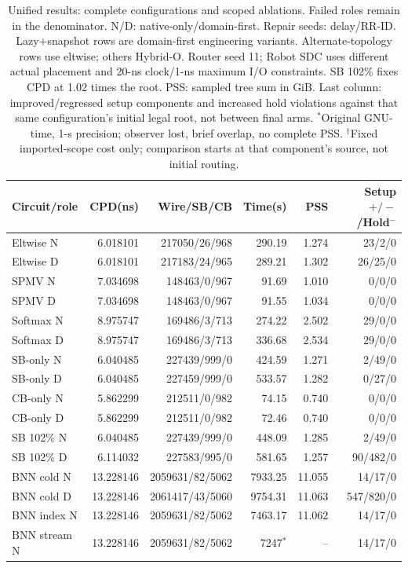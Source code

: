 \documentclass[conference,10pt]{IEEEtran}
\begin{document}
\begin{table}[t]
\centering\footnotesize\setlength{\tabcolsep}{3 pt}
\caption{Unified results: complete configurations and scoped ablations. Failed roles remain in the denominator. N/D: native-only/domain-first. Repair seeds: delay/RR-ID. Lazy+snapshot rows are domain-first engineering variants. Alternate-topology rows use eltwise; others Hybrid-O. Router seed 11; Robot SDC uses different actual placement and 20-ns clock/1-ns maximum I/O constraints. SB 102\% fixes CPD at 1.02 times the root. PSS: sampled tree sum in GiB. Last column: improved/regressed setup components and increased hold violations against that same configuration's initial legal root, not between final arms. $^{*}$Original GNU-time, 1-s precision; observer lost, brief overlap, no complete PSS. $^{\dagger}$Fixed imported-scope cost only; comparison starts at that component's source, not initial routing.}
\label{tab:completecost}
\begin{tabular}{lrrrrr}\hline
Circuit/role & CPD(ns) & Wire/SB/CB & Time(s) & PSS & Setup $+/-$/Hold$^-$\\\hline
Eltwise N&6.018101&217050/26/968&290.19&1.274&23/2/0\\
Eltwise D&6.018101&217183/24/965&289.21&1.302&26/25/0\\
SPMV N&7.034698&148463/0/967&91.69&1.010&0/0/0\\
SPMV D&7.034698&148463/0/967&91.55&1.034&0/0/0\\
Softmax N&8.975747&169486/3/713&274.22&2.502&29/0/0\\
Softmax D&8.975747&169486/3/713&336.68&2.534&29/0/0\\
SB-only N&6.040485&227439/999/0&424.59&1.271&2/49/0\\
SB-only D&6.040485&227459/999/0&533.57&1.282&0/27/0\\
CB-only N&5.862299&212511/0/982&74.15&0.740&0/0/0\\
CB-only D&5.862299&212511/0/982&72.46&0.740&0/0/0\\
SB 102\% N&6.040485&227439/999/0&448.09&1.285&2/49/0\\
SB 102\% D&6.114032&227583/995/0&581.65&1.257&90/482/0\\
BNN cold N&13.228146&2059631/82/5062&7933.25&11.055&14/17/0\\
BNN cold D&13.228146&2061417/43/5060&9754.31&11.063&547/820/0\\
BNN index N&13.228146&2059631/82/5062&7463.17&11.062&14/17/0\\
BNN stream N&13.228146&2059631/82/5062&7247$^{*}$&--&14/17/0\\

\end{tabular}
\end{table}
\end{document}
